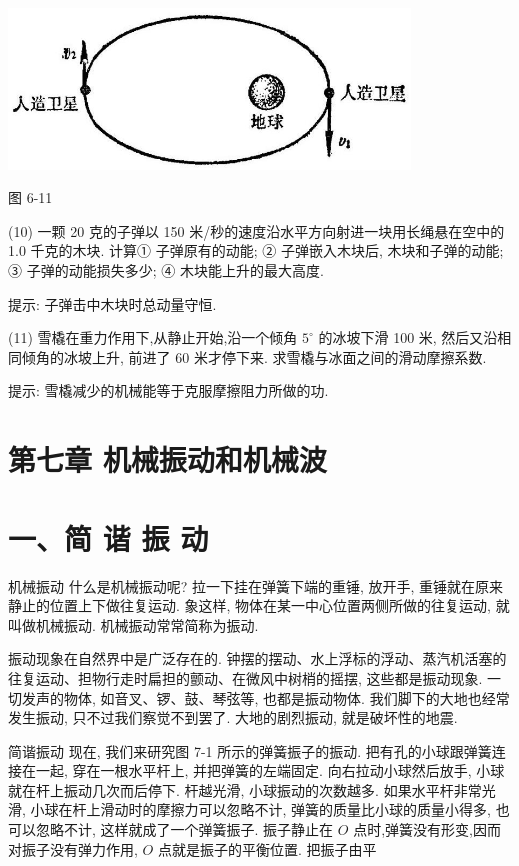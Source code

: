\documentclass[10pt]{article}
\begin{document}
\begin{center}
\includegraphics[max width=0.8\textwidth]{images/01912d55-147c-70aa-b0e0-1782a122f948_190_629441.jpg}
\end{center}

图 6-11

(10) 一颗 20 克的子弹以 150 米/秒的速度沿水平方向射进一块用长绳悬在空中的 1.0 千克的木块. 计算① 子弹原有的动能; ② 子弹嵌入木块后, 木块和子弹的动能; ③ 子弹的动能损失多少; ④ 木块能上升的最大高度.

提示: 子弹击中木块时总动量守恒.

(11) 雪橇在重力作用下,从静止开始,沿一个倾角 \({5}^{ \circ }\) 的冰坡下滑 100 米, 然后又沿相同倾角的冰坡上升, 前进了 60 米才停下来. 求雪橇与冰面之间的滑动摩擦系数.

提示: 雪橇减少的机械能等于克服摩擦阻力所做的功.

\section*{第七章 机械振动和机械波}

\section*{一、简 谐 振 动}

机械振动 什么是机械振动呢? 拉一下挂在弹簧下端的重锤, 放开手, 重锤就在原来静止的位置上下做往复运动. 象这样, 物体在某一中心位置两侧所做的往复运动, 就叫做机械振动. 机械振动常常简称为振动.

振动现象在自然界中是广泛存在的. 钟摆的摆动、水上浮标的浮动、蒸汽机活塞的往复运动、担物行走时扁担的颤动、在微风中树梢的摇摆, 这些都是振动现象. 一切发声的物体, 如音叉、锣、鼓、琴弦等, 也都是振动物体. 我们脚下的大地也经常发生振动, 只不过我们察觉不到罢了. 大地的剧烈振动, 就是破坏性的地震.

简谐振动 现在, 我们来研究图 7-1 所示的弹簧振子的振动. 把有孔的小球跟弹簧连接在一起, 穿在一根水平杆上, 并把弹簧的左端固定. 向右拉动小球然后放手, 小球就在杆上振动几次而后停下. 杆越光滑, 小球振动的次数越多. 如果水平杆非常光滑, 小球在杆上滑动时的摩擦力可以忽略不计, 弹簧的质量比小球的质量小得多, 也可以忽略不计, 这样就成了一个弹簧振子. 振子静止在 \(O\) 点时,弹簧没有形变,因而对振子没有弹力作用, \(O\) 点就是振子的平衡位置. 把振子由平
\end{document}
